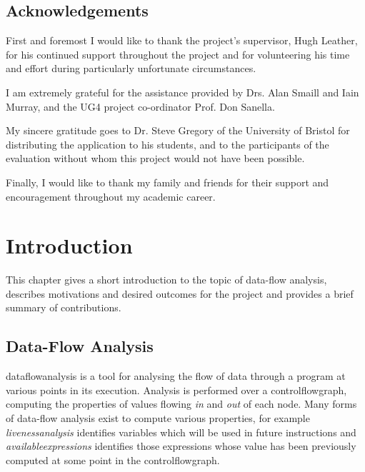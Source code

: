 \documentclass[bsc,twoside,singlespacing,parskip,logo,notimes,normalheadings]{infthesis}
\begin{document}
\maketitle

\section*{Acknowledgements}
First and foremost I would like to thank the project's supervisor,
Hugh Leather, for his continued support throughout the project and for
volunteering his time and effort during particularly unfortunate
circumstances.

I am extremely grateful for the assistance provided by Drs. Alan
Smaill and Iain Murray, and the UG4 project co-ordinator Prof. Don
Sanella.

My sincere gratitude goes to Dr. Steve Gregory of the University of
Bristol for distributing the application to his students, and to the
participants of the evaluation without whom this project would not
have been possible.

Finally, I would like to thank my family and friends for their support
and \break encouragement throughout my academic career.

\tableofcontents

\chapter{Introduction}

This chapter gives a short introduction to the topic of data-flow
analysis, describes motivations and desired outcomes for the project
and provides a brief summary of contributions.


    \section{Data-Flow Analysis}
    \Gls{dataflowanalysis} is a tool for analysing the flow of data
    through a program at various points in its execution. Analysis is
    performed over a \gls{controlflowgraph}, computing the properties
    of values flowing {\em in} and {\em out} of each node. Many forms
    of data-flow analysis exist to compute various properties, for
    example {\em \gls{livenessanalysis}} identifies variables which
    will be used in future instructions and {\em
      \gls{availableexpression}s} identifies those expressions whose
    value has been previously computed at some point in the
    \gls{controlflowgraph}.
    
\end{document}
